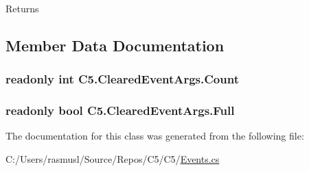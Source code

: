 \begin{DoxyReturn}{Returns}

\end{DoxyReturn}


\subsection{Member Data Documentation}
\hypertarget{class_c5_1_1_cleared_event_args_a5a635819ba820b9d202786554d84f737}{}
\subsubsection[{Count}]{\setlength{\rightskip}{0pt plus 5cm}readonly int C5.\+Cleared\+Event\+Args.\+Count}\label{class_c5_1_1_cleared_event_args_a5a635819ba820b9d202786554d84f737}




\hypertarget{class_c5_1_1_cleared_event_args_a2f772af2802fb799370ee6d351cb6d0b}{}
\subsubsection[{Full}]{\setlength{\rightskip}{0pt plus 5cm}readonly bool C5.\+Cleared\+Event\+Args.\+Full}\label{class_c5_1_1_cleared_event_args_a2f772af2802fb799370ee6d351cb6d0b}






The documentation for this class was generated from the following file\+:\begin{DoxyCompactItemize}
\item 
C\+:/\+Users/rasmusl/\+Source/\+Repos/\+C5/\+C5/\hyperlink{_events_8cs}{Events.\+cs}\end{DoxyCompactItemize}
